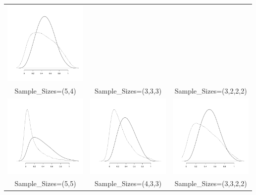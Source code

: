 \begin{appendix}
\begin{longtable}{ccc}
		\includegraphics[width=4.05cm]{Sim_Kendall-Kruskal_3222_a.pdf} \\ 
		              Sample\_Sizes=(5,4) &   Sample\_Sizes=(3,3,3)  &    Sample\_Sizes=(3,2,2,2) \\  
\hline 
	\includegraphics[width=4.05cm]{Sim_Kendall-Kruskal_55_b.pdf} & 
		\includegraphics[width=4.05cm]{Sim_Kendall-Kruskal_433_b.pdf} & 
		\includegraphics[width=4.05cm]{Sim_Kendall-Kruskal_3322_a.pdf} \\ 
		              Sample\_Sizes=(5,5) &   Sample\_Sizes=(4,3,3)  &    Sample\_Sizes=(3,3,2,2) \\  
		              \hline


\end{longtable}
\end{appendix}
